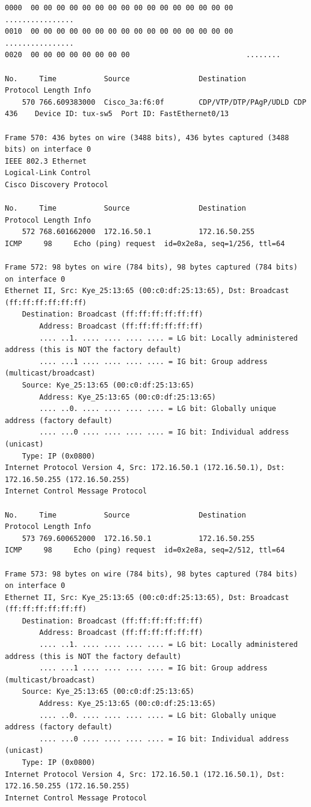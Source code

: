 \documentclass[a4paper,11pt]{article}
\begin{document}
\begin{lstlisting}
0000  00 00 00 00 00 00 00 00 00 00 00 00 00 00 00 00   ................
0010  00 00 00 00 00 00 00 00 00 00 00 00 00 00 00 00   ................
0020  00 00 00 00 00 00 00 00                           ........

No.     Time           Source                Destination           Protocol Length Info
    570 766.609383000  Cisco_3a:f6:0f        CDP/VTP/DTP/PAgP/UDLD CDP      436    Device ID: tux-sw5  Port ID: FastEthernet0/13  

Frame 570: 436 bytes on wire (3488 bits), 436 bytes captured (3488 bits) on interface 0
IEEE 802.3 Ethernet 
Logical-Link Control
Cisco Discovery Protocol

No.     Time           Source                Destination           Protocol Length Info
    572 768.601662000  172.16.50.1           172.16.50.255         ICMP     98     Echo (ping) request  id=0x2e8a, seq=1/256, ttl=64

Frame 572: 98 bytes on wire (784 bits), 98 bytes captured (784 bits) on interface 0
Ethernet II, Src: Kye_25:13:65 (00:c0:df:25:13:65), Dst: Broadcast (ff:ff:ff:ff:ff:ff)
    Destination: Broadcast (ff:ff:ff:ff:ff:ff)
        Address: Broadcast (ff:ff:ff:ff:ff:ff)
        .... ..1. .... .... .... .... = LG bit: Locally administered address (this is NOT the factory default)
        .... ...1 .... .... .... .... = IG bit: Group address (multicast/broadcast)
    Source: Kye_25:13:65 (00:c0:df:25:13:65)
        Address: Kye_25:13:65 (00:c0:df:25:13:65)
        .... ..0. .... .... .... .... = LG bit: Globally unique address (factory default)
        .... ...0 .... .... .... .... = IG bit: Individual address (unicast)
    Type: IP (0x0800)
Internet Protocol Version 4, Src: 172.16.50.1 (172.16.50.1), Dst: 172.16.50.255 (172.16.50.255)
Internet Control Message Protocol

No.     Time           Source                Destination           Protocol Length Info
    573 769.600652000  172.16.50.1           172.16.50.255         ICMP     98     Echo (ping) request  id=0x2e8a, seq=2/512, ttl=64

Frame 573: 98 bytes on wire (784 bits), 98 bytes captured (784 bits) on interface 0
Ethernet II, Src: Kye_25:13:65 (00:c0:df:25:13:65), Dst: Broadcast (ff:ff:ff:ff:ff:ff)
    Destination: Broadcast (ff:ff:ff:ff:ff:ff)
        Address: Broadcast (ff:ff:ff:ff:ff:ff)
        .... ..1. .... .... .... .... = LG bit: Locally administered address (this is NOT the factory default)
        .... ...1 .... .... .... .... = IG bit: Group address (multicast/broadcast)
    Source: Kye_25:13:65 (00:c0:df:25:13:65)
        Address: Kye_25:13:65 (00:c0:df:25:13:65)
        .... ..0. .... .... .... .... = LG bit: Globally unique address (factory default)
        .... ...0 .... .... .... .... = IG bit: Individual address (unicast)
    Type: IP (0x0800)
Internet Protocol Version 4, Src: 172.16.50.1 (172.16.50.1), Dst: 172.16.50.255 (172.16.50.255)
Internet Control Message Protocol


\end{lstlisting}
\end{document}
